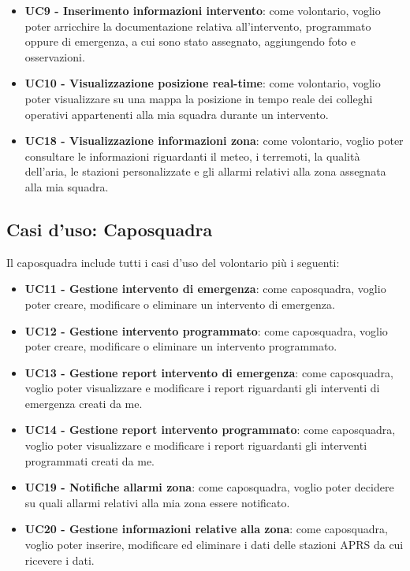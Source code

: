 \begin{itemize}
	\item \textbf{UC9 - Inserimento informazioni intervento}:
	come volontario, voglio poter arricchire la documentazione relativa all'intervento, programmato oppure di emergenza, a cui sono stato assegnato, aggiungendo foto e osservazioni.
	
	\item \textbf{UC10 - Visualizzazione posizione real-time}:
	come volontario, voglio poter visualizzare su una mappa la posizione in tempo reale dei colleghi operativi appartenenti alla mia squadra durante un intervento.
	
	\item \textbf{UC18 - Visualizzazione informazioni zona}:
	come volontario, voglio poter consultare le informazioni riguardanti il meteo, i terremoti, la qualità dell'aria, le stazioni personalizzate e gli allarmi relativi alla zona assegnata alla mia squadra.
\end{itemize}




\subsection{Casi d'uso: Caposquadra}
Il caposquadra include tutti i casi d'uso del volontario più i seguenti:
\begin{itemize}
	\item \textbf{UC11 - Gestione intervento di emergenza}:
	come caposquadra, voglio poter creare, modificare o eliminare un intervento di emergenza.
	
	\item \textbf{UC12 - Gestione intervento programmato}:
	come caposquadra, voglio poter creare, modificare o eliminare un intervento programmato.
	
	\item \textbf{UC13 - Gestione report intervento di emergenza}:
	come caposquadra, voglio poter visualizzare e modificare i report riguardanti gli interventi di emergenza creati da me.
	
	\item \textbf{UC14 - Gestione report intervento programmato}:
	come caposquadra, voglio poter visualizzare e modificare i report riguardanti gli interventi programmati creati da me.
		
	\item \textbf{UC19 - Notifiche allarmi zona}:
	come caposquadra, voglio poter decidere su quali  allarmi relativi alla mia zona essere notificato.
	
	\item \textbf{UC20 - Gestione informazioni relative alla zona}:
	come caposquadra, voglio poter inserire, modificare ed eliminare i dati delle stazioni APRS da cui ricevere i dati.
\end{itemize}

